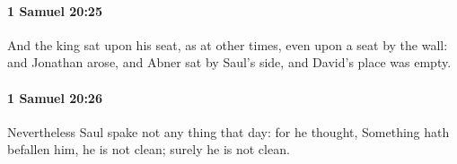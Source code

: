 		\paragraph{1 Samuel 20:25} %
			\label{1SAMUEL-20-25}

			And the king sat upon his seat, as at other times, even upon a seat by the wall: and Jonathan arose, and Abner sat by Saul’s side, and David’s place was empty.


		\paragraph{1 Samuel 20:26} %
			\label{1SAMUEL-20-26}

			Nevertheless Saul spake not any thing that day: for he thought, Something hath befallen him, he is not clean; surely he is not clean.


